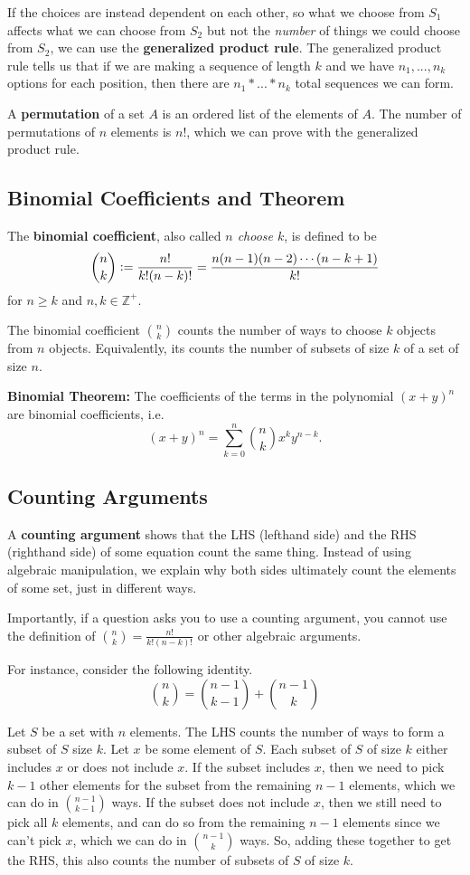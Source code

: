 \documentclass[12pt,letterpaper]{article}
\newcommand{\defeq}{\vcentcolon=}
\begin{document}
If the choices are instead dependent on each other, so what we choose from $S_1$ affects what we can choose from $S_2$ but not the \textit{number} of things we could choose from $S_2$, we can use the \textbf{generalized product rule}. The generalized product rule tells us that if we are making a sequence of length $k$ and we have $n_1,...,n_k$ options for each position, then there are $n_1*...*n_k$ total sequences we can form.

A \textbf{permutation} of a set $A$ is an ordered list of the elements of $A$. The number of permutations of $n$ elements is $n!$, which we can prove with the generalized product rule.

\subsection{Binomial Coefficients and Theorem}
The \textbf{binomial coefficient}, also called \textit{$n$ choose $k$}, is defined to be
\[
\binom{n}{k} \defeq \frac{n!}{k!(n-k)!} = \frac{n(n-1)(n-2)\cdots (n-k+1)}{k!}
\]
for $n \geq k$ and $n,k \in \mathbb{Z}^+$.

The binomial coefficient $\binom{n}{k}$ counts the number of ways to choose $k$ objects from $n$ objects. Equivalently, its counts the number of subsets of size $k$ of a set of size $n$.
    
\textbf{Binomial Theorem:} The coefficients of the terms in the polynomial $(x+y)^n$ are binomial coefficients, i.e.
\[
(x+y)^n = \sum_{k=0}^{n}\binom{n}{k}x^ky^{n-k}.
\]

\subsection{Counting Arguments}

A \textbf{counting argument} shows that the LHS (lefthand side) and the RHS (righthand side) of some equation count the same thing. Instead of using algebraic manipulation, we explain why both sides ultimately count the elements of some set, just in different ways.

Importantly, if a question asks you to use a counting argument, you cannot use the definition of $\binom{n}{k}=\frac{n!}{k!(n-k)!}$ or other algebraic arguments.

For instance, consider the following identity.
$$\binom{n}{k} = \binom{n-1}{k-1} + \binom{n-1}{k}$$

Let $S$ be a set with $n$ elements. The LHS counts the number of ways to form a subset of $S$ size $k$. Let $x$ be some element of $S$. Each subset of $S$ of size $k$ either includes $x$ or does not include $x$. If the subset includes $x$, then we need to pick $k-1$ other elements for the subset from the remaining $n-1$ elements, which we can do in $\binom{n-1}{k-1}$ ways. If the subset does not include $x$, then we still need to pick all $k$ elements, and can do so from the remaining $n-1$ elements since we can't pick $x$, which we can do in $\binom{n-1}{k}$ ways. So, adding these together to get the RHS, this also counts the number of subsets of $S$ of size $k$.
\end{document}
